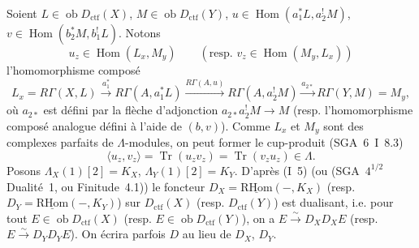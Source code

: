 \documentclass[11pt]{article}
\DeclareMathOperator{\Hom}{Hom}
\newcommand{\ob}{\operatorname{ob}}
\providecommand{\RHom}{\mathrm{RHom}}
\providecommand{\uRHom}{\underline{\RHom}}
\providecommand{\ctf}{\mathrm{ctf}}
\providecommand{\Tr}{\operatorname{Tr}}
\providecommand{\Tr}{\operatorname{Tr}}
\providecommand{\Tr}{\operatorname{Tr}}
\providecommand{\RHom}{\mathrm{RHom}}
\providecommand{\Hom}{\operatorname{Hom}}
\providecommand{\ob}{\operatorname{ob}}
\providecommand{\RHom}{\mathrm R\mathcal{H}om}
\providecommand{\Tr}{\operatorname{Tr}}
\providecommand{\RHom}{\mathrm{RHom}}
\providecommand{\Hom}{\operatorname{Hom}}
\providecommand{\Tr}{\operatorname{Tr}}
\begin{document}
Soient $L\in \ob D_{\ctf}(X)$, $M\in \ob D_{\ctf}(Y)$, $u\in\Hom(a_1^*L,a_2^!M)$, $v\in\Hom(b_2^*M,b_1^!L)$. Notons
\[
u_z\in\Hom(L_x,M_y)\qquad (\text{resp. }v_z\in\Hom(M_y,L_x))
\]
l'homomorphisme composé
\[
L_x=R\Gamma(X,L)\xrightarrow{a_1^*}R\Gamma(A,a_1^*L)
\xrightarrow{R\Gamma(A,u)}R\Gamma(A,a_2^!M)
\xrightarrow{a_{2*}}R\Gamma(Y,M)=M_y,
\]
où $a_{2*}$ est défini par la flèche d'adjonction $a_{2*}a_2^!M\to M$ (resp. l'homomorphisme composé analogue défini à l'aide de $(b,v)$). Comme $L_x$ et $M_y$ sont des complexes parfaits de $\Lambda$-modules, on peut former le cup-produit (SGA~6~I~8.3)
\begin{equation}\tag{1.1.1}
\langle u_z,v_z\rangle=\Tr(u_zv_z)=\Tr(v_zu_z)\in\Lambda.
\end{equation}
Posons $\Lambda_X(1)[2]=K_X$, $\Lambda_Y(1)[2]=K_Y$. D'après (I~5) (ou (SGA~$4^{1/2}$ Dualité~1, ou Finitude~4.1)) le foncteur $D_X=\uRHom(-,K_X)$ (resp. $D_Y=\uRHom(-,K_Y)$) sur $D_{\ctf}(X)$ (resp. $D_{\ctf}(Y)$) est dualisant, i.e. pour tout $E\in\ob D_{\ctf}(X)$ (resp. $E\in\ob D_{\ctf}(Y)$), on a $E\xrightarrow{\sim}D_XD_XE$ (resp. $E\xrightarrow{\sim}D_YD_YE$). On écrira parfois $D$ au lieu de $D_X$, $D_Y$.
\end{document}
